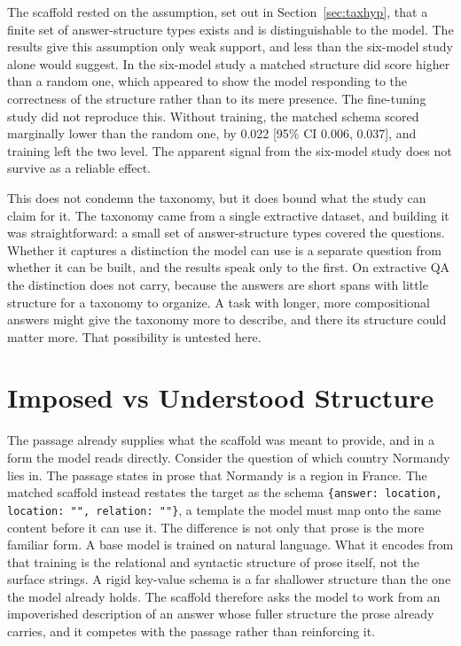 \documentclass[master]{thesis}
\newcommand{\sref}[1]{Section~\ref{#1}}  %
\begin{document}
The scaffold rested on the assumption, set out in \sref{sec:taxhyp}, that a finite set of answer-structure types exists and is distinguishable to the model. The results give this assumption only weak support, and less than the six-model study alone would suggest. In the six-model study a matched structure did score higher than a random one, which appeared to show the model responding to the correctness of the structure rather than to its mere presence. The fine-tuning study did not reproduce this. Without training, the matched schema scored marginally lower than the random one, by 0.022 [95\% CI 0.006, 0.037], and training left the two level. The apparent signal from the six-model study does not survive as a reliable effect.

This does not condemn the taxonomy, but it does bound what the study can claim for it. The taxonomy came from a single extractive dataset, and building it was straightforward: a small set of answer-structure types covered the questions. Whether it captures a distinction the model can use is a separate question from whether it can be built, and the results speak only to the first. On extractive QA the distinction does not carry, because the answers are short spans with little structure for a taxonomy to organize. A task with longer, more compositional answers might give the taxonomy more to describe, and there its structure could matter more. That possibility is untested here.

\section{Imposed vs Understood Structure}

The passage already supplies what the scaffold was meant to provide, and in a form the model reads directly. Consider the question of which country Normandy lies in. The passage states in prose that Normandy is a region in France. The matched scaffold instead restates the target as the schema \texttt{\{answer: location, location: "", relation: ""\}}, a template the model must map onto the same content before it can use it. The difference is not only that prose is the more familiar form. A base model is trained on natural language. What it encodes from that training is the relational and syntactic structure of prose itself, not the surface strings. A rigid key-value schema is a far shallower structure than the one the model already holds. The scaffold therefore asks the model to work from an impoverished description of an answer whose fuller structure the prose already carries, and it competes with the passage rather than reinforcing it.
\end{document}
